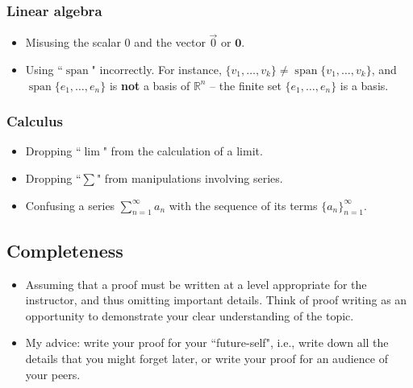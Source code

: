 \documentclass[11pt]{amsart}
\newcommand\R{\mathbb R}    %
\DeclareMathOperator{\spn}{span} %
\begin{document}
\subsubsection*{Linear algebra}
\begin{itemize}
	\item Misusing the scalar $0$ and the vector $\vec{0}$ or $\bm{0}$.
	\item Using ``$\spn$" incorrectly.  For instance, $\{v_1,\ldots, v_k \} \neq \spn\{v_1,\ldots, v_k \}$, and $\spn\{e_1,\ldots,e_n\}$ is \textbf{not} a basis of $\R^n$ -- the finite set $\{e_1,\ldots,e_n\}$ is a basis.
\end{itemize}

\subsubsection*{Calculus}
\begin{itemize}
	\item Dropping ``$\lim$" from the calculation of a limit.
	\item Dropping ``$\sum$" from manipulations involving series.
	\item Confusing a series $\sum_{n=1}^\infty a_n$ with the sequence of its terms $\{a_n\}_{n=1}^\infty$.
\end{itemize}

\subsection*{Completeness}
\begin{itemize}
	\item Assuming that a proof must be written at a level appropriate for the instructor, and thus omitting important details.  Think of proof writing as an opportunity to demonstrate your clear understanding of the topic.
	\item My advice: write your proof for your ``future-self", i.e., write down all the details that you might forget later, or write your proof for an audience of your peers.
\end{itemize}

\vfill 

%

%
%

\end{document}
